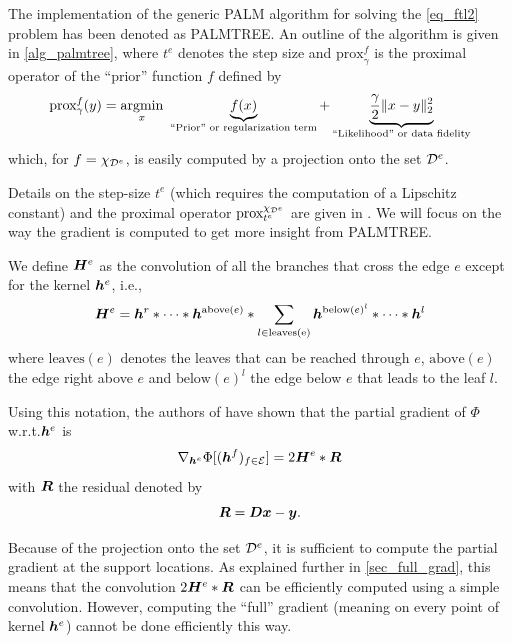 The implementation of the generic \ac{PALM} algorithm for solving the \eqref{eq_ftl2} problem has been denoted as \ac{PALMTREE}. 
An outline of the algorithm is given in \cref{alg_palmtree}, where $t^e$ denotes the step size and $\text{prox}^f_\gamma$ is the proximal operator of the “prior” function $f$ defined by \begin{equation*}\text{prox}^f_\gamma(y) = \underset{x}{\operatorname{argmin}}~ \underbrace{f(x)}_{\text{“Prior” or regularization term}} + \underbrace{\frac{\gamma}{2} \lVert x - y \rVert^2_2}_{\text{“Likelihood” or data fidelity}}\end{equation*} which, for $f = \chi_{{\mathcal D}^e}$, is easily computed by a projection onto the set ${\mathcal D}^e$.

\noindent
Details on the step-size $t^e$ (which requires the computation of a Lipschitz constant) and the proximal operator $\text{prox}^{\chi_{{\mathcal D}^e}}_{t^e}$ are given in \cite{chabiron_optimization_2016}. We will focus on the way the gradient is computed to get more insight from \ac{PALMTREE}.

\noindent
We define $\bm{H}^e$ as the convolution of all the branches that cross the edge $e$ except for the kernel $\bm{h}^e$, i.e., \begin{equation*}\bm{H}^e = \bm{h}^r * \dots * \bm{h}^{\text{above}(e)}  * \sum_{l \in \text{leaves(e)}} \bm{h}^{\text{below}(e)^l} * \dots * \bm{h}^{l}\end{equation*} where $\text{leaves}(e)$ denotes the leaves that can be reached through $e$, $\text{above}(e)$  the edge right above $e$ and $\text{below}(e)^l$ the edge below $e$ that leads to the leaf $l$.

\noindent
Using this notation, the authors of \cite{chabiron_optimization_2016} have shown that the partial gradient of $\Phi$ w.r.t.\@ $\bm{h}^e$ is 
\begin{equation*}\nabla_{\bm{h}^e} \Phi[(\bm{h}^f)_{f \in \mathcal E}] = 2 \bm{H}^e * \bm{R}\end{equation*} with $\bm{R}$ the residual denoted by
\begin{equation*}\bm{R} = \bm{D}\bm{x} - \bm{y}. \end{equation*}

\noindent
Because of the projection onto the set ${\mathcal D}^e$, it is sufficient to compute the partial gradient at the support locations. As explained further in \cref{sec_full_grad}, this means that the convolution $2 \bm{H}^e * \bm{R}$ can be efficiently computed using a simple convolution. However, computing the “full” gradient (meaning on every point of kernel $\bm{h}^e$) cannot be done efficiently this way.

